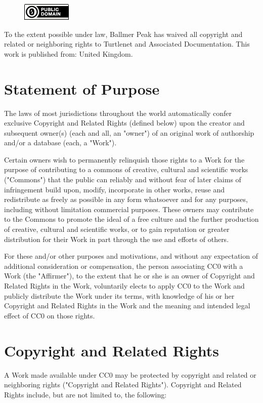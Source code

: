 \begin{figure}[h]
    \centering
    \includegraphics{images/appendicies/licence.png}
\end{figure}

\begin{center}
To the extent possible under law, Ballmer Peak has waived all copyright and
related or neighboring rights to Turtlenet and Associated Documentation. This
work is published from: United Kingdom.
\end{center}

\section {Statement of Purpose}
The laws of most jurisdictions throughout the world automatically confer
exclusive Copyright and Related Rights (defined below) upon the creator and
subsequent owner(s) (each and all, an "owner") of an original work of authorship
and/or a database (each, a "Work").

Certain owners wish to permanently relinquish those rights to a Work for the
purpose of contributing to a commons of creative, cultural and scientific works
("Commons") that the public can reliably and without fear of later claims of
infringement build upon, modify, incorporate in other works, reuse and
redistribute as freely as possible in any form whatsoever and for any purposes,
including without limitation commercial purposes. These owners may contribute to
the Commons to promote the ideal of a free culture and the further production of
creative, cultural and scientific works, or to gain reputation or greater
distribution for their Work in part through the use and efforts of others.

For these and/or other purposes and motivations, and without any expectation of
additional consideration or compensation, the person associating CC0 with a Work
(the "Affirmer"), to the extent that he or she is an owner of Copyright and
Related Rights in the Work, voluntarily elects to apply CC0 to the Work and
publicly distribute the Work under its terms, with knowledge of his or her
Copyright and Related Rights in the Work and the meaning and intended legal
effect of CC0 on those rights.

\section{Copyright and Related Rights}
A Work made available under CC0 may be protected by copyright and related or
neighboring rights ("Copyright and Related Rights"). Copyright and Related
Rights include, but are not limited to, the following:

